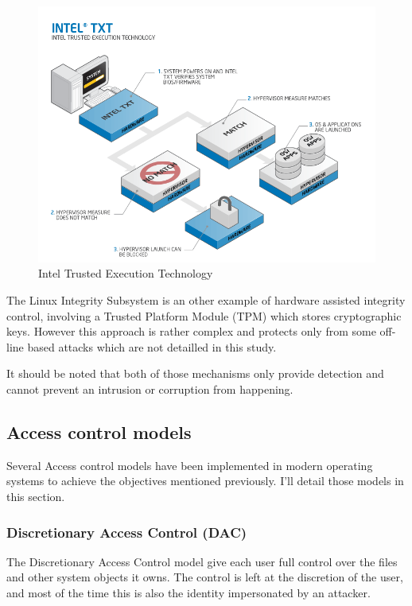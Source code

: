 \documentclass[pdftex,a4paper,titlepage,11pt]{article}
\begin{document}
\begin{figure}[h]
	\centering
	\includegraphics[scale=0.70]{techrefresh-info-txtfull.png}
	\caption{Intel Trusted Execution Technology}
	\label{INTELTXT}
\end{figure}

\smallskip

The Linux Integrity Subsystem \cite{linuxima} is an other example of hardware
assisted integrity control, involving a Trusted Platform Module (TPM) which
stores cryptographic keys. However this approach is rather complex and protects
only from some off-line based attacks which are not detailled in this study.

\bigskip

It should be noted that both of those mechanisms only provide detection and
cannot prevent an intrusion or corruption from happening.

\subsection{Access control models}

Several Access control models have been implemented in modern operating systems
to achieve the objectives mentioned previously. I'll detail those models in this
section.

\subsubsection{Discretionary Access Control (DAC)}

The Discretionary Access Control model give each user full control over the
files and other system objects it owns. The control is left at the discretion
of the user, and most of the time this is also the identity impersonated by an
attacker.
\end{document}
